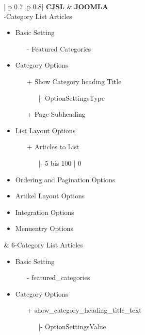 \begin{minipage}{0.7\textwidth}
\begin{longtable}{| p {0.7\textwidth} |p {0.8\textwidth}|}
\hline
\textbf{CJSL} 
&  
\textbf{JOOMLA} \\ -Category List Articles
\begin{itemize}
\item Basic Setting
	\begin{enumerate}
			\item[-] Featured Categories
	 \end{enumerate}
\item Category Options
	\begin{enumerate}
		\item[+]Show Category heading Title  
			\begin{enumerate}
			\item[|-] OptionSettingsType
			\end{enumerate}
		\item[+] Page Subheading
	\end{enumerate}
\item List Layout Options
\begin{enumerate}
   	   	\item[+] Articles to List
   	   	\begin{enumerate}
   	   				\item[|-] 5 bis 100 | 0
   	   			\end{enumerate}
   	   	\end{enumerate}
\item Ordering and Pagination Options
\item Artikel Layout Options
\item Integration Options
\item Menuentry Options
\end{itemize}
&
6-Category List Articles
\begin{itemize}
\item Basic Setting
	\begin{enumerate}
			\item[-] featured\_categories
	 \end{enumerate}
\item Category Options
	\begin{enumerate}
		\item[+] show\_category\_heading\_title\_text
			\begin{enumerate}
			\item[|-] OptionSettingsValue
			\end{enumerate}

\end{enumerate}
\end{itemize}
\end{longtable}
\end{minipage}
